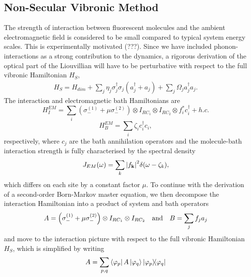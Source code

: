 \documentclass[]{article}
\begin{document}
\subsection{Non-Secular Vibronic Method}
The strength of interaction between fluorescent molecules and the ambient electromagnetic field is considered to be small compared to typical system energy scales. This is experimentally motivated (???). Since we have included phonon-interactions as a strong contribution to the dynamics, a rigorous derivation of the optical part of the Liouvillian will have to be perturbative with respect to the full vibronic Hamiltonian $H_S$,
\begin{align}
	H_{S}= H_{dim} + \sum_j\eta_j\sigma_j^{\dagger}\sigma_j(a_j^{\dagger}+a_j) +\sum_j \Omega_j a_j^{\dagger}a_j.
\end{align}
The interaction and electromagnetic bath Hamiltonians are
\begin{equation}
H_I^{EM} =\sum_{i} \left(\sigma_-^{(1)} + \mu\sigma_-^{(2)}\right)\otimes I_{RC_1}\otimes I_{RC_2}\otimes f_i^*c_i^{\dagger} + h.c.
\end{equation}
\begin{equation}
H_B^{EM} = \sum_i \zeta_i c_i^{\dagger}c_i,
\end{equation}
respectively, where $c_j$ are the bath annihilation operators and the molecule-bath interaction strength is fully characterised by the spectral density
\begin{equation}
J_{EM} (\omega)= \sum_{k}\abs{f_{\textbf{k}}}^2 \delta (\omega-\zeta_k),
\end{equation}
which differs on each site by a constant factor $\mu$. To continue with the derivation of a second-order Born-Markov master equation, we then decompose the interaction Hamiltonian into a product of system and bath operators 
\begin{equation}
A =  \left(\sigma_-^{(1)} + \mu\sigma_-^{(2)}\right)\otimes I_{RC_1}\otimes I_{RC_2} \quad \textnormal{and} \quad B = \sum_{j}f_j a_j
\end{equation}
and move to the interaction picture with respect to the full vibronic Hamiltonian $H_S$, which is simplified by writing
\begin{equation}
A = \sum_{p,q} \bra{\varphi_p}A\ket{\varphi_q}\dyad{\varphi_p}{\varphi_q}
\end{equation}
\end{document}
